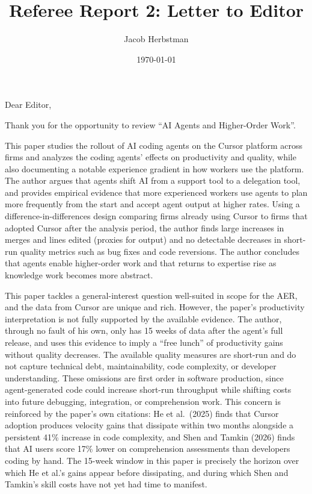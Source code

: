 \documentclass{article}
\title{Referee Report 2: Letter to Editor}
\author{Jacob Herbstman}
\date{\today}
\begin{document}
\maketitle

Dear Editor,

\vspace{0.5cm}

Thank you for the opportunity to review ``AI Agents and Higher-Order Work''.

This paper studies the rollout of AI coding agents on the Cursor platform across firms and analyzes the coding agents' effects on productivity and quality, while also documenting a notable experience gradient in how workers use the platform.
The author argues that agents shift AI from a support tool to a delegation tool, and provides empirical evidence that more experienced workers use agents to plan more frequently from the start and accept agent output at higher rates.
Using a difference-in-differences design comparing firms already using Cursor to firms that adopted Cursor after the analysis period, the author finds large increases in merges and lines edited (proxies for output) and no detectable decreases in short-run quality metrics such as bug fixes and code reversions.
The author concludes that agents enable higher-order work and that returns to expertise rise as knowledge work becomes more abstract.

This paper tackles a general-interest question well-suited in scope for the AER, and the data from Cursor are unique and rich.
However, the paper's productivity interpretation is not fully supported by the available evidence.
The author, through no fault of his own, only has 15 weeks of data after the agent's full release, and uses this evidence to imply a ``free lunch'' of productivity gains without quality decreases.
The available quality measures are short-run and do not capture technical debt, maintainability, code complexity, or developer understanding.
These omissions are first order in software production, since agent-generated code could increase short-run throughput while shifting costs into future debugging, integration, or comprehension work.
This concern is reinforced by the paper's own citations: He et al.\ (2025) finds that Cursor adoption produces velocity gains that dissipate within two months alongside a persistent 41\% increase in code complexity, and Shen and Tamkin (2026) finds that AI users score 17\% lower on comprehension assessments than developers coding by hand.
The 15-week window in this paper is precisely the horizon over which He et al.'s gains appear before dissipating, and during which Shen and Tamkin's skill costs have not yet had time to manifest.
\end{document}
